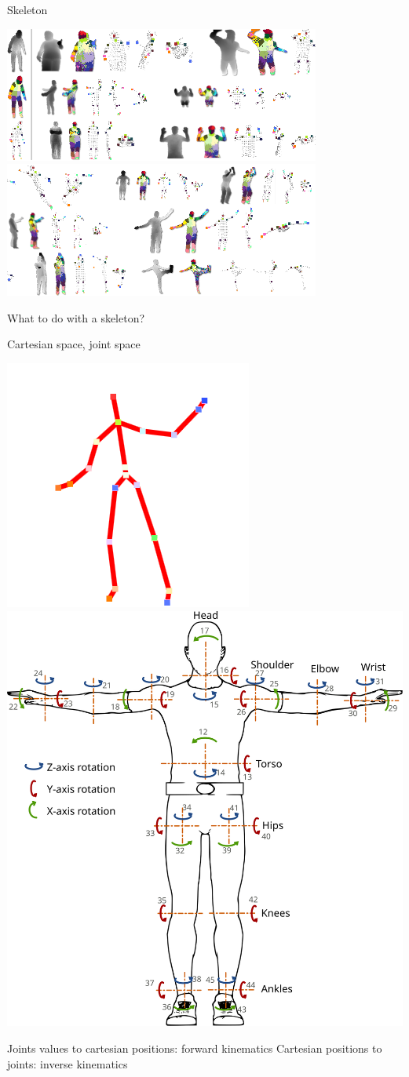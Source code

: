 \documentclass[compress]{beamer}
\begin{document}
\begin{frame}{Skeleton}
    \begin{center}
        \includegraphics[width=0.8\linewidth]{skeleton/skel4}\\
        \includegraphics[width=0.8\linewidth]{skeleton/skel5}
    \end{center}
\end{frame}

\begin{frame}{}
    \centering
    What to do with a skeleton?
\end{frame}

\begin{frame}{Cartesian space, joint space}
    \begin{center}
        \includegraphics[width=0.45\linewidth]{skeleton/skeleton}
        \includegraphics[width=0.45\linewidth]{human_joints}

        Joints values to cartesian positions: {\Medium forward kinematics}
        Cartesian positions to joints: {\Medium inverse kinematics}
    \end{center}
\end{frame}
\end{document}
